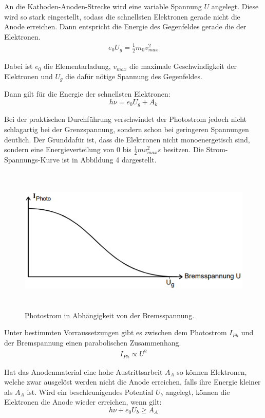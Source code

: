 An die Kathoden-Anoden-Strecke wird eine variable Spannung $U$ angelegt. Diese wird so stark eingestellt, sodass die
schnellsten Elektronen gerade nicht die Anode erreichen. Dann entspricht die Energie des Gegenfeldes gerade die der Elektronen.
\begin{align}
  e_0 U_g = \frac{1}{2} m_0 v_{max}^2
\end{align}

Dabei ist $e_0$ die Elementarladung, $v_{max}$ die maximale Geschwindigkeit der Elektronen und $U_g$ die dafür nötige
Spannung des Gegenfeldes.

Dann gilt für die Energie der schnellsten Elektronen:
\begin{equation}
  h \nu = e_0 U_g  + A_k
\end{equation}

Bei der praktischen Durchführung verschwindet der Photostrom jedoch nicht schlagartig bei der Grenzspannung, sondern schon
bei geringeren Spannungen deutlich. Der Grunddafür ist, dass die Elektronen nicht monoenergetisch sind, sondern eine
Energieverteilung von $0$ bis $\frac{1}{2} m v_{max}^2s$ besitzen.
Die Strom-Spannungs-Kurve ist in Abbildung 4 dargestellt.

\begin{figure}[H]
  \centering
  \includegraphics[height=7cm]{fermi.PNG}
  \caption{Photostrom in Abhängigkeit von der Bremsspannung. \cite{sample}}
  \label{fig:kathode}
\end{figure}

Unter bestimmten Vorraussetzungen gibt es zwischen dem Photostrom $I_{Ph}$ und der Bremspannung einen parabolischen Zusammenhang.
\begin{align*}
  I_{Ph} \propto U^2
\end{align*}


Hat das Anodenmaterial eine hohe Austrittsarbeit $A_A$ so können Elektronen, welche zwar ausgelöst werden nicht die
Anode erreichen, falls ihre Energie kleiner als $A_A$ ist. Wird ein beschleunigendes Potential $U_b$ angelegt, können
die Elektronen die Anode wieder erreichen, wenn gilt:
\begin{equation}
  h \nu + e_0 U_b \geq A_A
\end{equation}
